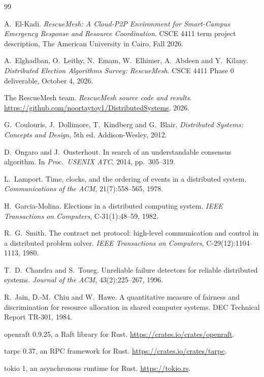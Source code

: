 \documentclass[10pt,a4paper]{article}
\begin{document}
\newpage
\begin{thebibliography}{99}
\small

 A.~El-Kadi. \emph{RescueMesh: A Cloud-P2P Environment for Smart-Campus Emergency Response and Resource Coordination}. CSCE 4411 term project description, The American University in Cairo, Fall 2026.

 A.~Elghadban, O.~Leithy, N.~Emam, W.~Elhimer, A.~Abdeen and Y.~Kilany. \emph{Distributed Election Algorithms Survey: RescueMesh}. CSCE 4411 Phase 0 deliverable, October 4, 2026.

 The RescueMesh team. \emph{RescueMesh source code and results}. \url{https://github.com/noortaytoy1/DistributedSystems}, 2026.

 G.~Coulouris, J.~Dollimore, T.~Kindberg and G.~Blair. \emph{Distributed Systems: Concepts and Design}, 5th ed. Addison-Wesley, 2012.

 D.~Ongaro and J.~Ousterhout. In search of an understandable consensus algorithm. In \emph{Proc.\ USENIX ATC}, 2014, pp.~305--319.

 L.~Lamport. Time, clocks, and the ordering of events in a distributed system. \emph{Communications of the ACM}, 21(7):558--565, 1978.

 H.~Garcia-Molina. Elections in a distributed computing system. \emph{IEEE Transactions on Computers}, C-31(1):48--59, 1982.

 R.~G.~Smith. The contract net protocol: high-level communication and control in a distributed problem solver. \emph{IEEE Transactions on Computers}, C-29(12):1104--1113, 1980.

 T.~D.~Chandra and S.~Toueg. Unreliable failure detectors for reliable distributed systems. \emph{Journal of the ACM}, 43(2):225--267, 1996.

 R.~Jain, D.-M.~Chiu and W.~Hawe. A quantitative measure of fairness and discrimination for resource allocation in shared computer systems. DEC Technical Report TR-301, 1984.

 openraft 0.9.25, a Raft library for Rust. \url{https://crates.io/crates/openraft}.

 tarpc 0.37, an RPC framework for Rust. \url{https://crates.io/crates/tarpc}.

 tokio 1, an asynchronous runtime for Rust. \url{https://tokio.rs}.


\end{thebibliography}
\end{document}
